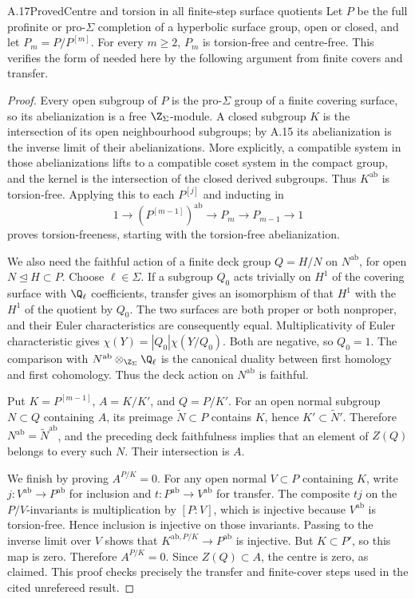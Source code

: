 \begin{claim}{A.17}{Proved}{Centre and torsion in all finite-step surface quotients}
Let $P$ be the full profinite or pro-$\Sigma$ completion of a hyperbolic surface group, open or closed, and let $P_m=P/P^{[m]}$. For every $m\ge2$, $P_m$ is torsion-free and centre-free. This verifies the form of \cite[Theorem 2.9 and Corollary 2.10]{A_Yamaguchi2026} needed here by the following argument from finite covers and transfer.
\end{claim}
\begin{proof}
Every open subgroup of $P$ is the pro-$\Sigma$ group of a finite covering surface, so its abelianization is a free $\Z_\Sigma$-module. A closed subgroup $K$ is the intersection of its open neighbourhood subgroups; by A.15 its abelianization is the inverse limit of their abelianizations. More explicitly, a compatible system in those abelianizations lifts to a compatible coset system in the compact group, and the kernel is the intersection of the closed derived subgroups. Thus $K^{\mathrm{ab}}$ is torsion-free. Applying this to each $P^{[j]}$ and inducting in
\[
1\to(P^{[m-1]})^{\mathrm{ab}}\to P_m\to P_{m-1}\to1
\]
proves torsion-freeness, starting with the torsion-free abelianization.

We also need the faithful action of a finite deck group $Q=H/N$ on $N^{\mathrm{ab}}$, for open $N\trianglelefteq H\subset P$. Choose $\ell\in\Sigma$. If a subgroup $Q_0$ acts trivially on $H^1$ of the covering surface with $\Q_\ell$ coefficients, transfer gives an isomorphism of that $H^1$ with the $H^1$ of the quotient by $Q_0$. The two surfaces are both proper or both nonproper, and their Euler characteristics are consequently equal. Multiplicativity of Euler characteristic gives $\chi(Y)=|Q_0|\chi(Y/Q_0)$. Both are negative, so $Q_0=1$. The comparison with $N^{\mathrm{ab}}\otimes_{\Z_\Sigma}\Q_\ell$ is the canonical duality between first homology and first cohomology. Thus the deck action on $N^{\mathrm{ab}}$ is faithful.

Put $K=P^{[m-1]}$, $A=K/K'$, and $Q=P/K'$. For an open normal subgroup $N\subset Q$ containing $A$, its preimage $\widetilde N\subset P$ contains $K$, hence $K'\subset\widetilde N'$. Therefore $N^{\mathrm{ab}}=\widetilde N^{\mathrm{ab}}$, and the preceding deck faithfulness implies that an element of $Z(Q)$ belongs to every such $N$. Their intersection is $A$.

We finish by proving $A^{P/K}=0$. For any open normal $V\subset P$ containing $K$, write $j:V^{\mathrm{ab}}\to P^{\mathrm{ab}}$ for inclusion and $t:P^{\mathrm{ab}}\to V^{\mathrm{ab}}$ for transfer. The composite $tj$ on the $P/V$-invariants is multiplication by $[P:V]$, which is injective because $V^{\mathrm{ab}}$ is torsion-free. Hence inclusion is injective on those invariants. Passing to the inverse limit over $V$ shows that $K^{\mathrm{ab},P/K}\to P^{\mathrm{ab}}$ is injective. But $K\subset P'$, so this map is zero. Therefore $A^{P/K}=0$. Since $Z(Q)\subset A$, the centre is zero, as claimed. This proof checks precisely the transfer and finite-cover steps used in the cited unrefereed result.
\end{proof}

